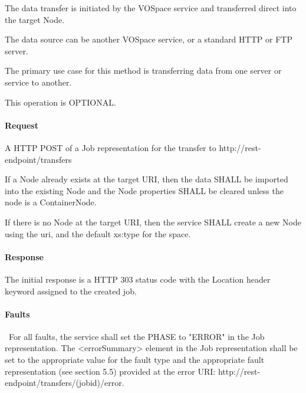\documentclass[11pt,a4paper]{ivoa}
\begin{document}
The data transfer is initiated by the VOSpace service and transferred direct into the target Node.

The data source can be another VOSpace service, or a standard HTTP or FTP server.

The primary use case for this method is transferring data from one server or service to another.

This operation is OPTIONAL.

\paragraph{Request}
A HTTP POST of a Job representation for the transfer to http://rest-endpoint/transfers

If a Node already exists at the target URI, then the data SHALL be imported into the existing Node and the Node properties SHALL be cleared unless the node is a ContainerNode.

If there is no Node at the target URI, then the service SHALL create a new Node using the uri, and the default xs:type for the space.

\paragraph{Response}
The initial response is a HTTP 303 status code with the Location header keyword assigned to the created job.

\paragraph{Faults}\
For all faults, the service shall set the PHASE to "ERROR" in the Job representation. The <errorSummary> element in the Job representation shall be set to the appropriate value for the fault type and the appropriate fault representation (see section 5.5) provided at the error URI: http://rest-endpoint/transfers/(jobid)/error.
\end{document}
